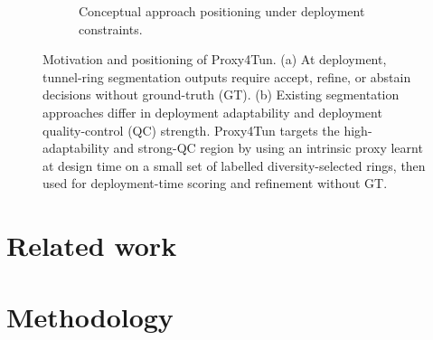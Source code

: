 \documentclass[a4paper,fleqn]{cas-dc}
\begin{document}
{\begin{figure}[t]
\begin{subfigure}{0.98\textwidth}
\caption{Conceptual approach positioning under deployment constraints.}
\end{subfigure}

\caption{
Motivation and positioning of Proxy4Tun.
(a) At deployment, tunnel-ring segmentation outputs require accept, refine, or abstain decisions without ground-truth (GT).
(b) Existing segmentation approaches differ in deployment adaptability and deployment quality-control (QC) strength. Proxy4Tun targets the high-adaptability and strong-QC region by using an intrinsic proxy learnt at design time on a small set of labelled diversity-selected rings, then used for deployment-time scoring and refinement without GT.
}
\label{fig:proxy4tun_motivation_positioning}
\end{figure}




\FloatBarrier %
\section{Related work}\label{sec:related}




\section{Methodology}\label{sec:methods}

}
\end{document}
